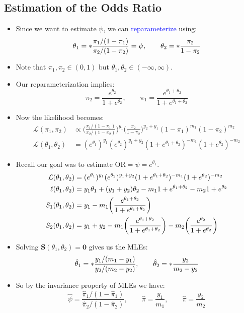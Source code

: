 \documentclass[oneside]{book}\usepackage[]{graphicx}\usepackage[svgnames]{xcolor}
\let\log\relax%
\providecommand{\Vector}[1]{\bm{#1}}%
\begin{document}
\subsection*{Estimation of the Odds Ratio}
\begin{itemize}
    \item Since we want to estimate $ \psi $, we can \textcolor{Blue}{reparameterize} using:
          \[ \theta_1=\log*{\frac{\pi_1/(1-\pi_1)}{\pi_2/(1-\pi_2)}}=\log{\psi},\qquad \theta_2=\log*{\frac{\pi_2}{1-\pi_2}}  \]
    \item Note that $ \pi_1,\pi_2\in(0,1) $ but $ \theta_1,\theta_2\in(-\infty,\infty) $.
    \item Our reparameterization implies:
          \[ \pi_2=\frac{e^{\theta_2}}{1+e^{\theta_2}},\qquad \pi_1=\frac{e^{\theta_1+\theta_2}}{1+e^{\theta_1+\theta_2}} \]
    \item Now the likelihood becomes:
          \begin{align*}
              \mathcal{L}(\pi_1,\pi_2)       & \propto \biggl(\frac{\pi_1/(1-\pi_1)}{\pi_2/(1-\pi_2)}\biggr)^{\!y_1}\biggl(\frac{\pi_2}{1-\pi_2} \biggr)^{\!y_2+y_1}(1-\pi_1)^{m_1}(1-\pi_2)^{m_2} \\
              \mathcal{L}(\theta_1,\theta_2) & =(e^{\theta_1})^{y_1}(e^{\theta_2})^{y_1+y_2}(1+e^{\theta_1+\theta_2})^{-m_1}(1+e^{\theta_2})^{-m_2}
          \end{align*}
    \item Recall our goal was to estimate $ \text{OR}=\psi=e^{\theta_1} $.
          \begin{align*}
              \mathcal{L}(\theta_1,\theta_2) & =(e^{\theta_1})^{y_1}(e^{\theta_2})^{y_1+y_2}(1+e^{\theta_1+\theta_2})^{-m_1}(1+e^{\theta_2})^{-m_2}                                 \\
              \ell(\theta_1,\theta_2)        & =y_1\theta_1+(y_1+y_2)\theta_2-m_1\log{1+e^{\theta_1+\theta_2}}-m_2\log{1+e^{\theta_2}}                                              \\
              S_1(\theta_1,\theta_2)         & =y_1-m_1\biggl(\frac{e^{\theta_1+\theta_2}}{1+e^{\theta_1+\theta_2}}\biggr)                                                          \\
              S_2(\theta_1,\theta_2)         & =y_1+y_2-m_1\biggl(\frac{e^{\theta_1+\theta_2}}{1+e^{\theta_1+\theta_2}}\biggr)-m_2\biggl(\frac{e^{\theta_2}}{1+e^{\theta_2}}\biggr)
          \end{align*}
    \item Solving $ \Vector{S}(\theta_1,\theta_2)=\Vector{0} $ gives us the MLEs:
          \[ \hat{\theta}_1=\log*{\frac{y_1/(m_1-y_1)}{y_2/(m_2-y_2)}},\qquad \hat{\theta}_2=\log*{\frac{y_2}{m_2-y_2}} \]
    \item So by the invariance property of MLEs we have:
          \[ \hat{\psi}=\frac{\hat{\pi}_1/(1-\hat{\pi}_1)}{\hat{\pi}_2/(1-\hat{\pi}_2)},\qquad\hat{\pi}=\frac{y_1}{m_1},\qquad\hat{\pi}=\frac{y_2}{m_2}  \]
\end{itemize}
\end{document}
